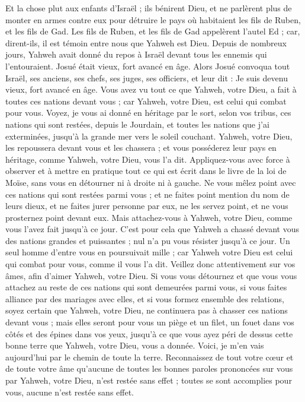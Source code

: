 \begin{multicols}{2}
Et la chose plut aux enfants d’Israël ; ils bénirent Dieu, et ne parlèrent plus de monter en armes contre eux pour détruire le pays où habitaient les fils de Ruben, et les fils de Gad.
Les fils de Ruben, et les fils de Gad appelèrent l’autel Ed ; car, dirent-ils, il est témoin entre nous que Yahweh est Dieu.
\VerseOne{}Depuis de nombreux jours, Yahweh avait donné du repos à Israël devant tous les ennemis qui l’entouraient. Josué était vieux, fort avancé en âge.
Alors Josué convoqua tout Israël, ses anciens, ses chefs, ses juges, ses officiers, et leur dit : Je suis devenu vieux, fort avancé en âge.
Vous avez vu tout ce que Yahweh, votre Dieu, a fait à toutes ces nations devant vous ; car Yahweh, votre Dieu, est celui qui combat pour vous.
Voyez, je vous ai donné en héritage par le sort, selon vos tribus, ces nations qui sont restées, depuis le Jourdain, et toutes les nations que j’ai exterminées, jusqu’à la grande mer vers le soleil couchant.
Yahweh, votre Dieu, les repoussera devant vous et les chassera ; et vous posséderez leur pays en héritage, comme Yahweh, votre Dieu, vous l’a dit.
Appliquez-vous avec force à observer et à mettre en pratique tout ce qui est écrit dans le livre de la loi de Moïse, sans vous en détourner ni à droite ni à gauche.
Ne vous mêlez point avec ces nations qui sont restées parmi vous ; et ne faites point mention du nom de leurs dieux, et ne faites jurer personne par eux, ne les servez point, et ne vous prosternez point devant eux.
Mais attachez-vous à Yahweh, votre Dieu, comme vous l’avez fait jusqu’à ce jour.
C’est pour cela que Yahweh a chassé devant vous des nations grandes et puissantes ; nul n’a pu vous résister jusqu’à ce jour.
Un seul homme d’entre vous en poursuivait mille ; car Yahweh votre Dieu est celui qui combat pour vous, comme il vous l’a dit.
Veillez donc attentivement sur vos âmes, afin d’aimer Yahweh, votre Dieu.
Si vous vous détournez et que vous vous attachez au reste de ces nations qui sont demeurées parmi vous, si vous faites alliance par des mariages avec elles, et si vous formez ensemble des relations,
soyez certain que Yahweh, votre Dieu, ne continuera pas à chasser ces nations devant vous ; mais elles seront pour vous un piège et un filet, un fouet dans vos côtés et des épines dans vos yeux, jusqu’à ce que vous ayez péri de dessus cette bonne terre que Yahweh, votre Dieu, vous a donnée.
Voici, je m’en vais aujourd’hui par le chemin de toute la terre. Reconnaissez de tout votre cœur et de toute votre âme qu’aucune de toutes les bonnes paroles prononcées sur vous par Yahweh, votre Dieu, n’est restée sans effet ; toutes se sont accomplies pour vous, aucune n’est restée sans effet\FTNT{}.

\end{multicols}
